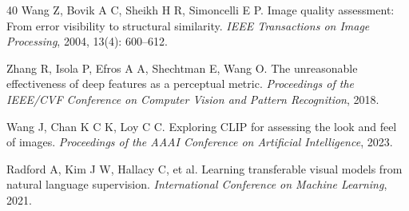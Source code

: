 \documentclass[times,twocolumn,final]{elsarticle}
\begin{document}
\begin{thebibliography}{40}
Wang Z, Bovik A C, Sheikh H R, Simoncelli E P. Image quality assessment: From error visibility to structural similarity. \textit{IEEE Transactions on Image Processing}, 2004, 13(4): 600--612.

Zhang R, Isola P, Efros A A, Shechtman E, Wang O. The unreasonable effectiveness of deep features as a perceptual metric. \textit{Proceedings of the IEEE/CVF Conference on Computer Vision and Pattern Recognition}, 2018.

Wang J, Chan K C K, Loy C C. Exploring CLIP for assessing the look and feel of images. \textit{Proceedings of the AAAI Conference on Artificial Intelligence}, 2023.

Radford A, Kim J W, Hallacy C, et al. Learning transferable visual models from natural language supervision. \textit{International Conference on Machine Learning}, 2021.

\end{thebibliography}
\end{document}
